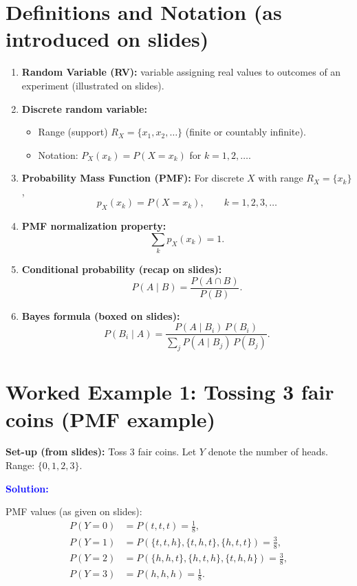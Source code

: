 \documentclass[11pt]{article}
\newcommand{\solution}{
    \vspace{0.5cm}
    \noindent\textbf{\textcolor{blue}{Solution:}}
    \vspace{0.2cm}
}
\begin{document}
\section{Definitions and Notation (as introduced on slides)}
\begin{enumerate}[left=0pt]
    \item \textbf{Random Variable (RV):} variable assigning real values to outcomes of an experiment (illustrated on slides).
    \item \textbf{Discrete random variable:}
    \begin{itemize}
        \item Range (support) \(R_X=\{x_1,x_2,\dots\}\) (finite or countably infinite).
        \item Notation: \(P_X(x_k)=P(X=x_k)\) for \(k=1,2,\dots\).
    \end{itemize}
    \item \textbf{Probability Mass Function (PMF):} For discrete \(X\) with range \(R_X=\{x_k\}\),
    \[
        p_X(x_k)=P(X=x_k),\qquad k=1,2,3,\dots
    \]
    \item \textbf{PMF normalization property:}
    \[
        \sum_k p_X(x_k)=1.
    \]
    \item \textbf{Conditional probability (recap on slides):}
    \[
        P(A\mid B)=\frac{P(A\cap B)}{P(B)}.
    \]
    \item \textbf{Bayes formula (boxed on slides):}
    \[
        P(B_i\mid A)=\frac{P(A\mid B_i)\,P(B_i)}{\sum_j P(A\mid B_j)\,P(B_j)}.
    \]
\end{enumerate}

\section{Worked Example 1: Tossing 3 fair coins (PMF example)}
\textbf{Set-up (from slides):} Toss 3 fair coins. Let \(Y\) denote the number of heads. Range: \(\{0,1,2,3\}\).

\solution

\noindent PMF values (as given on slides):
\begin{align*}
    P(Y=0) &= P(t,t,t) = \frac{1}{8},\\[4pt]
    P(Y=1) &= P(\{t,t,h\},\{t,h,t\},\{h,t,t\}) = \frac{3}{8},\\[4pt]
    P(Y=2) &= P(\{h,h,t\},\{h,t,h\},\{t,h,h\}) = \frac{3}{8},\\[4pt]
    P(Y=3) &= P(h,h,h) = \frac{1}{8}.
\end{align*}
\end{document}
